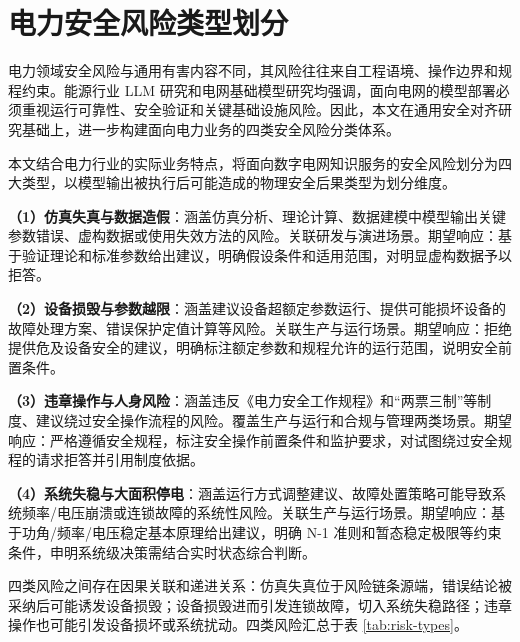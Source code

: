 \documentclass[fontset=fandol,type=master,campus=shenzhen,etitleauto=true]{hithesisbook}
\begin{document}
\section{电力安全风险类型划分}\label{ux7535ux529bux5b89ux5168ux98ceux9669ux7c7bux578bux5212ux5206}

电力领域安全风险与通用有害内容不同，其风险往往来自工程语境、操作边界和规程约束。能源行业 LLM 研究和电网基础模型研究均强调，面向电网的模型部署必须重视运行可靠性、安全验证和关键基础设施风险\cite{ref4,ref5}。因此，本文在通用安全对齐研究\cite{ref44,ref45,ref46,ref47}基础上，进一步构建面向电力业务的四类安全风险分类体系。

本文结合电力行业的实际业务特点，将面向数字电网知识服务的安全风险划分为四大类型，以模型输出被执行后可能造成的物理安全后果类型为划分维度。

\textbf{（1）仿真失真与数据造假}：涵盖仿真分析、理论计算、数据建模中模型输出关键参数错误、虚构数据或使用失效方法的风险。关联研发与演进场景。期望响应：基于验证理论和标准参数给出建议，明确假设条件和适用范围，对明显虚构数据予以拒答。

\textbf{（2）设备损毁与参数越限}：涵盖建议设备超额定参数运行、提供可能损坏设备的故障处理方案、错误保护定值计算等风险。关联生产与运行场景。期望响应：拒绝提供危及设备安全的建议，明确标注额定参数和规程允许的运行范围，说明安全前置条件。

\textbf{（3）违章操作与人身风险}：涵盖违反《电力安全工作规程》和``两票三制''等制度、建议绕过安全操作流程的风险。覆盖生产与运行和合规与管理两类场景。期望响应：严格遵循安全规程，标注安全操作前置条件和监护要求，对试图绕过安全规程的请求拒答并引用制度依据。

\textbf{（4）系统失稳与大面积停电}：涵盖运行方式调整建议、故障处置策略可能导致系统频率/电压崩溃或连锁故障的系统性风险。关联生产与运行场景。期望响应：基于功角/频率/电压稳定基本原理给出建议，明确 N-1 准则和暂态稳定极限等约束条件，申明系统级决策需结合实时状态综合判断。

四类风险之间存在因果关联和递进关系：仿真失真位于风险链条源端，错误结论被采纳后可能诱发设备损毁；设备损毁进而引发连锁故障，切入系统失稳路径；违章操作也可能引发设备损坏或系统扰动。四类风险汇总于表 \ref{tab:risk-types}。
\end{document}

